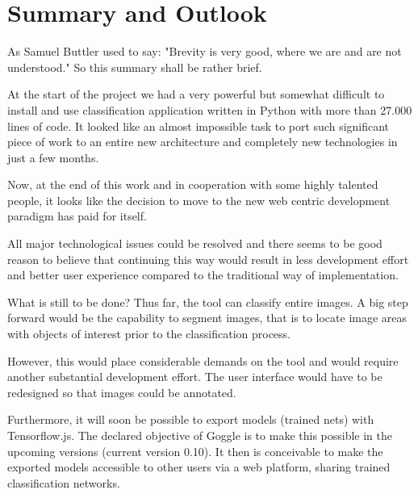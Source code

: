 \chapter{Summary and Outlook}

As Samuel Buttler used to say: "Brevity is very good,
where we are and are not understood." So this summary shall be rather brief.

At the start of the project we had a very powerful but
somewhat difficult to install and use classification
 application written in Python with more than 27.000 lines of code. 
It looked like
an almost impossible task to port such significant piece of
work to an entire new architecture and completely new technologies in just a few months.

Now, at the end of this work and in cooperation with some 
highly talented people, it looks like the decision to
 move to the new web centric development paradigm has 
 paid for itself.

All major technological issues could be resolved and there seems to be good reason to believe that continuing this way
would result in less development effort and better user
experience compared to the traditional way of
implementation.

What is still to be done?
Thus far, the tool can classify entire images. A big step forward would be the capability to segment images, 
that is to locate image areas with objects of interest
prior to the classification process. 

However, this would place considerable demands on the tool and would
require another substantial development effort. The user interface would have to be redesigned so that 
images could be annotated.  

Furthermore, it will soon be possible to export models
 (trained nets) with Tensorflow.js. The declared objective
of Goggle is to make this possible in the upcoming
versions (current version 0.10). It then is conceivable
to make the exported models accessible to other users
via a web platform, sharing trained classification
networks. 
